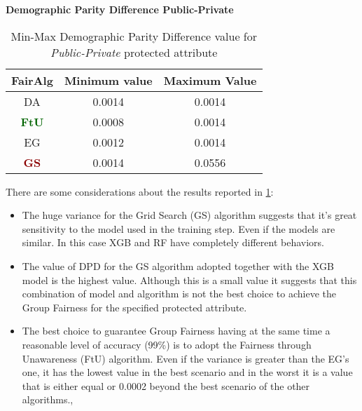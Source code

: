 \textbf{Demographic Parity Difference Public-Private}
\begin{table}
    \centering
    \begin{tabular}{|c|c|c|}
        \hline
        \textbf{FairAlg} & \textbf{Minimum value} & \textbf{Maximum Value} \\
        \hline
        DA & 0.0014 & 0.0014 \\
        \hline
        \textcolor{darkgreen}{\textbf{FtU}} & 0.0008 & 0.0014 \\
        \hline
        EG & 0.0012 & 0.0014 \\
        \hline
        \textcolor{darkred}{\textbf{GS}} & 0.0014 & 0.0556 \\
        \hline
    \end{tabular}
    \caption{Min-Max Demographic Parity Difference value for \emph{Public-Private} protected attribute}
    \label{tab:pp_dpd}
\end{table}

There are some considerations about the results reported in \cref{tab:pp_dpd}:

\begin{itemize}
    \item The huge variance for the Grid Search (GS) algorithm suggests that it's great sensitivity to the model used in the training step. Even if the models are similar. In this case XGB and RF have completely different behaviors.

    \item The value of DPD for the GS algorithm adopted together with the XGB model is the highest value. Although this is a small value it suggests that this combination of model and algorithm is not the best choice to achieve the Group Fairness for the specified protected attribute.

    \item The best choice to guarantee Group Fairness having at the same time a reasonable level of accuracy (99\%) is to adopt the Fairness through Unawareness (FtU) algorithm. Even if the variance is greater than the EG's one, it has the lowest value in the best scenario and in the worst it is a value that is either equal or 0.0002 beyond the best scenario of the other algorithms., 
\end{itemize}

